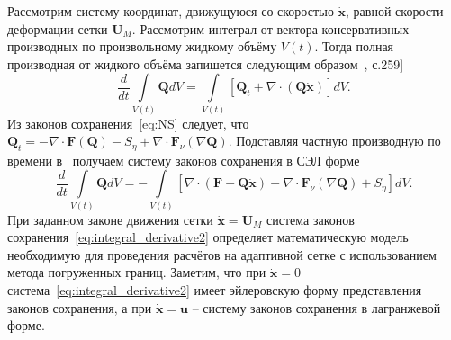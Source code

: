 Рассмотрим систему координат, движущуюся со скоростью $\dot{\mathbf{x}}$, равной скорости деформации сетки $\mathbf{U}_M$. Рассмотрим интеграл от вектора консервативных производных по произвольному жидкому объёму $V(t)$. Тогда полная производная от жидкого объёма запишется следующим образом~\cite{budak2002}, с.259]
\begin{equation}\label{eq:integral_derivative}
\frac{d}{dt}\int \limits_{V(t)}\mathbf{Q}dV = \int \limits_{V(t)}\left[\mathbf{Q}_t + \nabla \cdot (\mathbf{Q}\dot{\mathbf{x}})\right]dV .
\end{equation}
Из законов сохранения~\eqref{eq:NS} следует, что $\mathbf{Q}_t = -\nabla \cdot \mathbf{F}(\mathbf{Q})-S_{\eta} + \nabla\cdot\mathbf{F}_{\nu}(\nabla \mathbf{Q})$. Подставляя частную производную по времени в~\cite{eq:integral_derivative} получаем систему законов сохранения в СЭЛ форме
\begin{equation}\label{eq:integral_derivative2}
\frac{d}{dt}\int \limits_{V(t)}\mathbf{Q}dV = 
-\int \limits_{V(t)}\left[ \nabla \cdot(\mathbf{F} - \mathbf{Q}\dot{\mathbf{x}}) - \nabla\cdot\mathbf{F}_{\nu}(\nabla \mathbf{Q}) + S_{\eta} \right] dV .
\end{equation}
При заданном законе движения сетки  $\dot{\mathbf{x}} = \mathbf{U}_M$ система законов сохранения~\eqref{eq:integral_derivative2} определяет математическую модель необходимую для проведения расчётов на адаптивной сетке с использованием метода погруженных границ. Заметим, что при  $\dot{\mathbf{x}} = 0$ система~\eqref{eq:integral_derivative2} имеет эйлеровскую форму представления законов сохранения, а при $\dot{\mathbf{x}} = \mathbf{u}$  – систему законов сохранения в лагранжевой форме.
